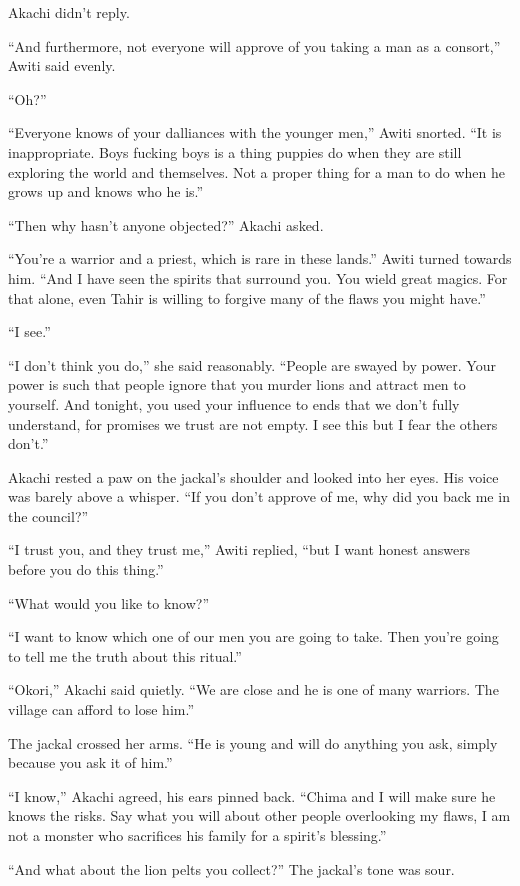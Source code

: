 Akachi didn't reply. 

``And furthermore, not everyone will approve of you taking a man as a consort,'' Awiti said evenly.

``Oh?''

``Everyone knows of your dalliances with the younger men,'' Awiti snorted. ``It is inappropriate. Boys fucking boys is a thing puppies do when they are still exploring the world and themselves. Not a proper thing for a man to do when he grows up and knows who he is.''

``Then why hasn't anyone objected?'' Akachi asked.

``You're a warrior and a priest, which is rare in these lands.'' Awiti turned towards him. ``And I have seen the spirits that surround you. You wield great magics. For that alone, even Tahir is willing to forgive many of the flaws you might have.''

``I see.''

``I don't think you do,'' she said reasonably. ``People are swayed by power. Your power is such that people ignore that you murder lions and attract men to yourself. And tonight, you used your influence to ends that we don't fully understand, for promises we trust are not empty. I see this but I fear the others don't.''

Akachi rested a paw on the jackal's shoulder and looked into her eyes. His voice was barely above a whisper. ``If you don't approve of me, why did you back me in the council?''

``I trust you, and they trust me,'' Awiti replied, ``but I want honest answers before you do this thing.''

``What would you like to know?''

``I want to know which one of our men you are going to take. Then you're going to tell me the truth about this ritual.''

``Okori,'' Akachi said quietly. ``We are close and he is one of many warriors. The village can afford to lose him.''

The jackal crossed her arms. ``He is young and will do anything you ask, simply because you ask it of him.''

``I know,'' Akachi agreed, his ears pinned back. ``Chima and I will make sure he knows the risks. Say what you will about other people overlooking my flaws, I am not a monster who sacrifices his family for a spirit's blessing.''

``And what about the lion pelts you collect?'' The jackal's tone was sour.


